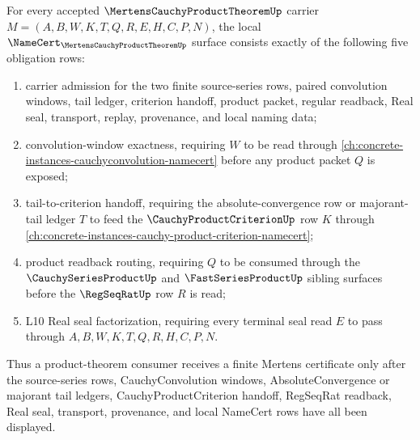 \begin{theorem}
\label{thm:mertens-cauchy-product-theorem-namecert-obligations}
For every accepted $\MertensCauchyProductTheoremUp$ carrier $M=(A,B,W,K,T,Q,R,E,H,C,P,N)$, the local $\NameCert_{\MertensCauchyProductTheoremUp}$ surface consists exactly of the following five obligation rows:
\begin{enumerate}
\item carrier admission for the two finite source-series rows, paired convolution windows, tail ledger, criterion handoff, product packet, regular readback, Real seal, transport, replay, provenance, and local naming data;
\item convolution-window exactness, requiring $W$ to be read through \autoref{ch:concrete-instances-cauchyconvolution-namecert} before any product packet $Q$ is exposed;
\item tail-to-criterion handoff, requiring the absolute-convergence row or majorant-tail ledger $T$ to feed the $\CauchyProductCriterionUp$ row $K$ through \autoref{ch:concrete-instances-cauchy-product-criterion-namecert};
\item product readback routing, requiring $Q$ to be consumed through the $\CauchySeriesProductUp$ and $\FastSeriesProductUp$ sibling surfaces before the $\RegSeqRatUp$ row $R$ is read;
\item L10 Real seal factorization, requiring every terminal seal read $E$ to pass through $A,B,W,K,T,Q,R,H,C,P,N$.
\end{enumerate}

Thus a product-theorem consumer receives a finite Mertens certificate only after the source-series rows, CauchyConvolution windows, AbsoluteConvergence or majorant tail ledgers, CauchyProductCriterion handoff, RegSeqRat readback, Real seal, transport, provenance, and local NameCert rows have all been displayed.
\end{theorem}
